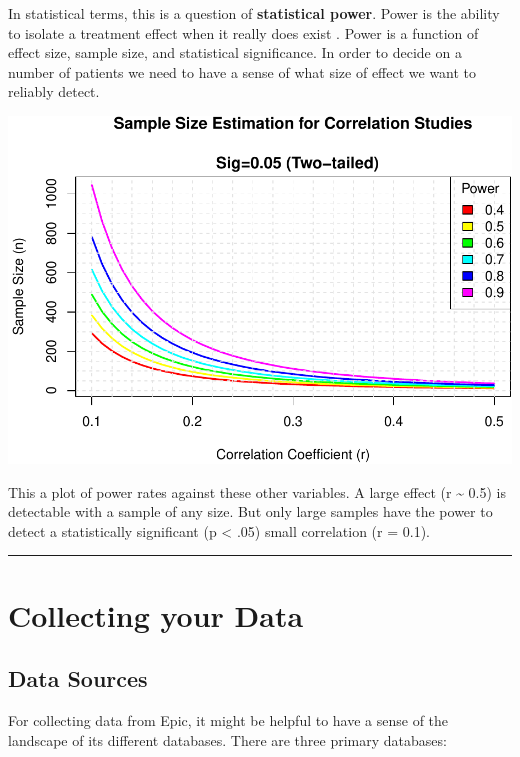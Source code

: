 \documentclass[
]{report}
\begin{document}
In statistical terms, this is a question of \textbf{statistical power}.
Power is the ability to isolate a treatment effect when it really does
exist \citep{Cohen1988}. Power is a function of effect size, sample
size, and statistical significance. In order to decide on a number of
patients we need to have a sense of what size of effect we want to
reliably detect.

\includegraphics{index_files/figure-latex/power-1.pdf}

This a plot of power rates against these other variables. A large effect
(r \textasciitilde{} 0.5) is detectable with a sample of any size. But
only large samples have the power to detect a statistically significant
(p \textless{} .05) small correlation (r = 0.1).

\begin{center}\rule{0.5\linewidth}{0.5pt}\end{center}

\hypertarget{collecting-your-data}{%
\chapter{Collecting your Data}\label{collecting-your-data}}

\hypertarget{data-sources}{%
\section{Data Sources}\label{data-sources}}

For collecting data from Epic, it might be helpful to have a sense of
the landscape of its different databases. There are three primary
databases:
\end{document}
